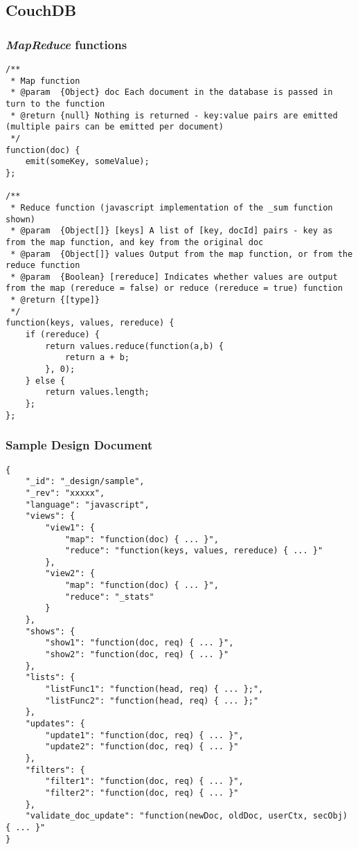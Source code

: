 \subsection{CouchDB}

\subsubsection{\textit{MapReduce} functions}
\label{couchdb-mapreduce-contracts}
\begin{verbatim}
/**
 * Map function
 * @param  {Object} doc Each document in the database is passed in turn to the function
 * @return {null} Nothing is returned - key:value pairs are emitted (multiple pairs can be emitted per document)
 */
function(doc) {
    emit(someKey, someValue);
};

/**
 * Reduce function (javascript implementation of the _sum function shown)
 * @param  {Object[]} [keys] A list of [key, docId] pairs - key as from the map function, and key from the original doc
 * @param  {Object[]} values Output from the map function, or from the reduce function
 * @param  {Boolean} [rereduce] Indicates whether values are output from the map (rereduce = false) or reduce (rereduce = true) function
 * @return {[type]}
 */
function(keys, values, rereduce) {
    if (rereduce) {
        return values.reduce(function(a,b) {
            return a + b;
        }, 0);
    } else {
        return values.length;
    };
};
\end{verbatim}

\subsubsection{Sample Design Document}
\label{couchdb-design-doc-sample}
\begin{verbatim}
{
    "_id": "_design/sample",
    "_rev": "xxxxx",
    "language": "javascript",
    "views": {
        "view1": {
            "map": "function(doc) { ... }",
            "reduce": "function(keys, values, rereduce) { ... }"
        },
        "view2": {
            "map": "function(doc) { ... }",
            "reduce": "_stats"            
        }
    },
    "shows": {
        "show1": "function(doc, req) { ... }",
        "show2": "function(doc, req) { ... }"
    },
    "lists": {
        "listFunc1": "function(head, req) { ... };",
        "listFunc2": "function(head, req) { ... };"
    },
    "updates": {
        "update1": "function(doc, req) { ... }",
        "update2": "function(doc, req) { ... }"
    },
    "filters": {
        "filter1": "function(doc, req) { ... }",
        "filter2": "function(doc, req) { ... }"
    },
    "validate_doc_update": "function(newDoc, oldDoc, userCtx, secObj) { ... }"
}

\end{verbatim}

